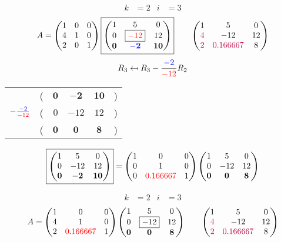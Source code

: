 \documentclass[pdf]{beamer}
\begin{document}
\begin{frame}{}\begin{align*} k &= 2 & i &= 3 \end{align*} $$A=\begin{pmatrix}1&0&0\\4&1&0\\2&0&1\end{pmatrix} \boxed{\begin{pmatrix}1&5&0\\0&\boxed{{\color{red}-12}}&12\\\mathbf{0}&\mathbf{{\color{blue}-2}}&\mathbf{10}\end{pmatrix}} \quad\quad \begin{pmatrix}1&5&0\\{\color{purple}4}&-12&12\\{\color{purple}2}&{\color{purple}0.166667}&8\end{pmatrix}$$ $$R_3 \mapsfrom R_3 - \frac{{\color{blue}-2}}{{\color{red}-12}} R_2$$ \begin{center}\begin{tabular}{cccccc}  &(& $ \mathbf{0} $ & $ \mathbf{-2} $ & $ \mathbf{10} $ &)\\$ -\frac{{\color{blue}-2}}{{\color{red}-12}} $&(& $ 0 $ & $ -12 $ & $ 12 $ &)\\\hline  &(& $ \mathbf{0} $ & $ \mathbf{0} $ & $ \mathbf{8} $ &) \end{tabular}\end{center} $$ \boxed{\begin{pmatrix}1&5&0\\0&-12&12\\\mathbf{0}&\mathbf{-2}&\mathbf{10}\end{pmatrix}} = \begin{pmatrix}1&0&0\\0&1&0\\0&{\color{red}0.166667}&1\end{pmatrix} \begin{pmatrix}1&5&0\\0&-12&12\\\mathbf{0}&\mathbf{0}&\mathbf{8}\end{pmatrix} $$\end{frame}
\begin{frame}{}\begin{align*} k &= 2 & i &= 3 \end{align*}$$A=\begin{pmatrix}1&0&0\\4&1&0\\2&{\color{red}0.166667}&1\end{pmatrix} \begin{pmatrix}1&5&0\\0&\boxed{-12}&12\\\mathbf{0}&\mathbf{0}&\mathbf{8}\end{pmatrix} \quad\quad \begin{pmatrix}1&5&0\\{\color{purple}4}&-12&12\\{\color{purple}2}&{\color{purple}0.166667}&8\end{pmatrix}$$\end{frame}
\end{document}
